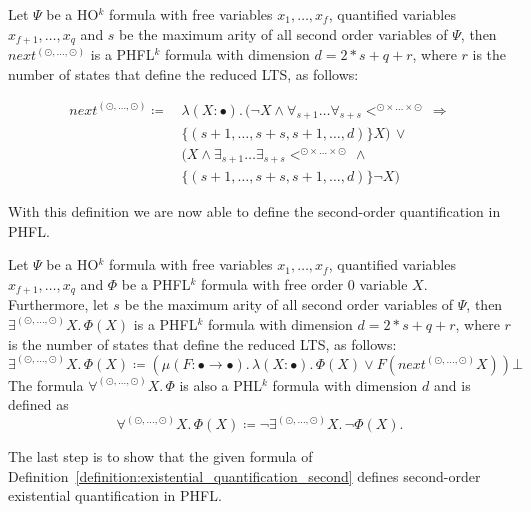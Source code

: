 \begin{definition}
    \label{definition:lower_bounds_next_second}
    Let $\Psi$ be a HO$^k$ formula with free variables $x_1, \dots, x_f$, quantified variables $x_{f+1}, \dots,
    x_q$ and $s$ be the maximum arity of all second order variables of $\Psi$, then $next^{(\odot, \dots, \odot)}$
    is a PHFL$^k$ formula with dimension $d = 2 * s + q + r$, where  $r$ is the number of states that define the reduced LTS, as follows:

    \begin{align*}
        next^{(\odot, \dots, \odot)} \coloneqq &\,\lambda (X \colon \bullet).\, (\neg X \wedge \forall_{s +
        1}\dots\forall_{s + s}<^{\odot \times \dots \times \odot}\, \Rightarrow \\&\,\{(s +
        1, \dots, s + s, s + 1, \dots, d)\} X) \,\vee \\&\,(X \wedge \exists_{s + 1}\dots\exists_{s + s} <^{\odot
        \times \dots \times \odot} \,\wedge \\&\,\{(s + 1, \dots, s + s, s + 1, \dots, d)\}
        \neg X)
    \end{align*}
\end{definition}

With this definition we are now able to define the second-order quantification in PHFL.

\begin{definition}
    \label{definition:existential_quantification_second}
    Let $\Psi$ be a HO$^k$ formula with free variables $x_1, \dots, x_f$, quantified variables $x_{f+1}, \dots,
    x_q$ and $\Phi$ be a PHFL$^k$ formula with free order $0$ variable $X$. Furthermore, let $s$ be the maximum arity
    of all second order variables of $\Psi$, then $\exists^{(\odot, \dots, \odot)}X .\,\Phi(X)$
    is a PHFL$^k$ formula with dimension $d = 2 * s + q + r$, where $r$ is the number of states that define the reduced LTS, as follows:
    \[\exists^{(\odot, \dots, \odot)}X.\, \Phi(X) \coloneqq (\mu (F \colon \bullet \rightarrow \bullet).\, \lambda (X
    \colon \bullet).\, \Phi(X) \vee F(next^{(\odot, \dots, \odot)} X)) \bot
    \]
    The formula $\forall^{(\odot, \dots, \odot)}X.\,\Phi$ is also a PHL$^k$ formula with dimension $d$ and is defined as
    \[\forall^{(\odot, \dots, \odot)}X.\,\Phi(X) \coloneqq \neg \exists^{(\odot, \dots, \odot)}X .\,\neg\Phi(X).\]
\end{definition}

The last step is to show that the given formula of Definition~\ref{definition:existential_quantification_second} defines
second-order existential quantification in PHFL.

